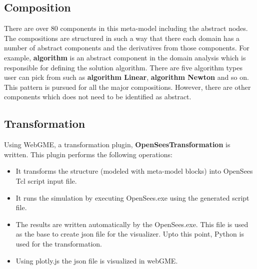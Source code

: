 \documentclass[letterpaper]{article}
\begin{document}
	\subsection*{Composition}
	There are over 80 components in this meta-model including the abstract nodes.	The compositions are structured in such a way that there each domain has a number of abstract components and the derivatives from those components. For example, \textbf{algorithm} is an abstract component in the domain analysis which is responsible for defining the solution algorithm.  There are five algorithm types user can pick from such as \textbf{algorithm Linear}, \textbf{algorithm Newton} and so on. This pattern is pursued for all the major compositions. However, there are other components which does not need to be identified as abstract.
	
	\subsection*{Transformation}
	Using WebGME, a transformation plugin, \textbf{OpenSeesTransformation} is written. This plugin performs the following operations:
	\begin{itemize}
		\item It transforms the structure (modeled with meta-model blocks) into OpenSees Tcl script input file.
		\item It runs the simulation by executing OpenSees.exe using the generated script file.
		\item The results are written automatically by the OpenSees.exe. This file is used as the base to create json file for the visualizer. Upto this point, Python is used for the transformation.
		\item Using plotly.js the json file is visualized in webGME.
	\end{itemize}
	   
	
\end{document}
